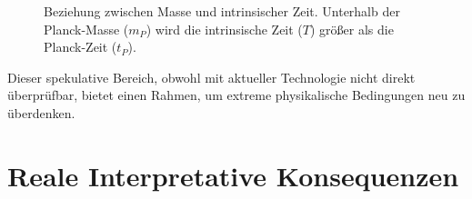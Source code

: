 \documentclass[a4paper,12pt]{article}
\begin{document}
	\begin{figure}[h]
		\centering
		\caption{Beziehung zwischen Masse und intrinsischer Zeit. Unterhalb der Planck-Masse ($m_P$) wird die intrinsische Zeit ($T$) größer als die Planck-Zeit ($t_P$).}
	\end{figure}
	
	Dieser spekulative Bereich, obwohl mit aktueller Technologie nicht direkt überprüfbar, bietet einen Rahmen, um extreme physikalische Bedingungen neu zu überdenken.
	
	\section{Reale Interpretative Konsequenzen}
	
\end{document}
